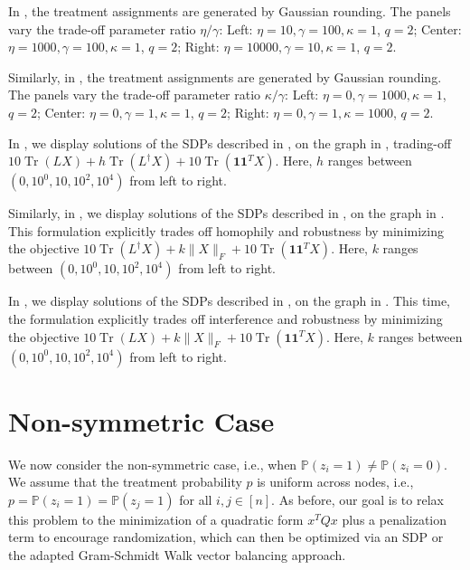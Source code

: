 \documentclass[12pt]{article}
\theoremstyle{definition}
\numberwithin{equation}{section}
\numberwithin{figure}{section}
\numberwithin{equation}{section}
\numberwithin{figure}{section}
\begin{document}
In , the treatment assignments are generated by Gaussian rounding. The panels vary the trade-off parameter ratio $\eta/\gamma$: Left: $\eta= 10, \gamma =100, \kappa = 1$, $q=2$; Center: $\eta= 1000, \gamma =100, \kappa = 1$, $q=2$; Right: $\eta= 10000, \gamma =10, \kappa = 1$, $q=2$.

Similarly, in , the treatment assignments are generated by Gaussian rounding. The panels vary the trade-off parameter ratio $\kappa/\gamma$: Left: $\eta= 0, \gamma =1000, \kappa = 1$, $q=2$; Center: $\eta= 0, \gamma =1, \kappa = 1$,  $q=2$; Right: $\eta= 0, \gamma =1, \kappa = 1000$,  $q=2$.


In , we display solutions of the SDPs described in , on the graph in , trading-off $10\operatorname{Tr}(L X) + h \operatorname{Tr}(L^{\dagger} X) + 10 \operatorname{Tr}(\mathbf{1}\mathbf{1}^T X)$. Here, $h$ ranges between $(0,10^0, 10, 10^2, 10^4)$ from left to right.

Similarly, in , we display solutions of the SDPs described in , on the graph in  . This formulation explicitly trades off homophily and robustness by minimizing the objective $10\operatorname{Tr}(L^\dagger X) + k \| X\|_{F} + 10 \operatorname{Tr}(\mathbf{1}\mathbf{1}^T X)$. Here, $k$ ranges between $(0,10^0, 10, 10^2, 10^4)$ from left to right. 

In , we display solutions of the SDPs described in , on the graph in  . This time, the formulation explicitly trades off interference and robustness by minimizing the objective $10\operatorname{Tr}(LX) + k \| X\|_{F} + 10 \operatorname{Tr}(\mathbf{1}\mathbf{1}^T X)$. Here, $k$ ranges between $(0,10^0, 10, 10^2, 10^4)$ from left to right. 

\section{Non-symmetric Case} \label{section:non_symmetric}

We now consider the non-symmetric case, i.e., when $\mathbb{P}(z_i = 1) \neq \mathbb{P}(z_i = 0)$. We assume that the treatment probability $p$ is uniform across nodes, i.e., $p = \mathbb{P}(z_i = 1) = \mathbb{P}(z_j = 1)$ for all $i,j \in [n]$. As before, our goal is to relax this problem to the minimization of a quadratic form $x^T Q x$ plus a penalization term to encourage randomization, which can then be optimized via an SDP or the adapted Gram-Schmidt Walk vector balancing approach.
\end{document}
